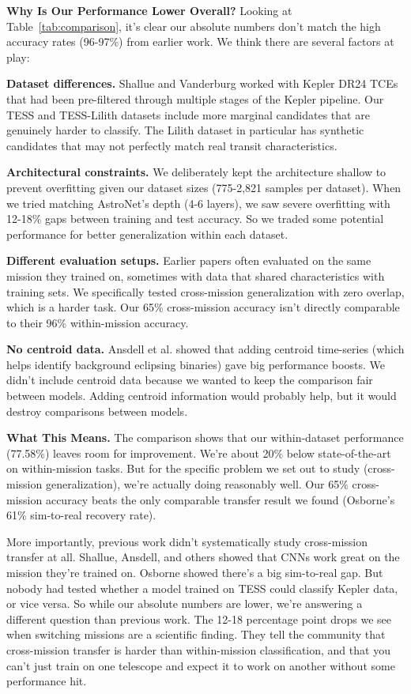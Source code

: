 \documentclass[letterpaper]{article} %
\begin{document}
\textbf{Why Is Our Performance Lower Overall?} Looking at Table~\ref{tab:comparison}, it's clear our absolute numbers don't match the high accuracy rates (96-97\%) from earlier work. We think there are several factors at play:

\textbf{Dataset differences.} Shallue and Vanderburg worked with Kepler DR24 TCEs that had been pre-filtered through multiple stages of the Kepler pipeline. Our TESS and TESS-Lilith datasets include more marginal candidates that are genuinely harder to classify. The Lilith dataset in particular has synthetic candidates that may not perfectly match real transit characteristics.

\textbf{Architectural constraints.} We deliberately kept the architecture shallow to prevent overfitting given our dataset sizes (775-2,821 samples per dataset). When we tried matching AstroNet's depth (4-6 layers), we saw severe overfitting with 12-18\% gaps between training and test accuracy. So we traded some potential performance for better generalization within each dataset.

\textbf{Different evaluation setups.} Earlier papers often evaluated on the same mission they trained on, sometimes with data that shared characteristics with training sets. We specifically tested cross-mission generalization with zero overlap, which is a harder task. Our 65\% cross-mission accuracy isn't directly comparable to their 96\% within-mission accuracy.

\textbf{No centroid data.} Ansdell et al. showed that adding centroid time-series (which helps identify background eclipsing binaries) gave big performance boosts. We didn't include centroid data because we wanted to keep the comparison fair between models. Adding centroid information would probably help, but it would destroy comparisons between models.

\textbf{What This Means.} The comparison shows that our within-dataset performance (77.58\%) leaves room for improvement. We're about 20\% below state-of-the-art on within-mission tasks. But for the specific problem we set out to study (cross-mission generalization), we're actually doing reasonably well. Our 65\% cross-mission accuracy beats the only comparable transfer result we found (Osborne's 61\% sim-to-real recovery rate).

More importantly, previous work didn't systematically study cross-mission transfer at all. Shallue, Ansdell, and others showed that CNNs work great on the mission they're trained on. Osborne showed there's a big sim-to-real gap. But nobody had tested whether a model trained on TESS could classify Kepler data, or vice versa.
So while our absolute numbers are lower, we're answering a different question than previous work. The 12-18 percentage point drops we see when switching missions are a scientific finding. They tell the community that cross-mission transfer is harder than within-mission classification, and that you can't just train on one telescope and expect it to work on another without some performance hit.
\end{document}

